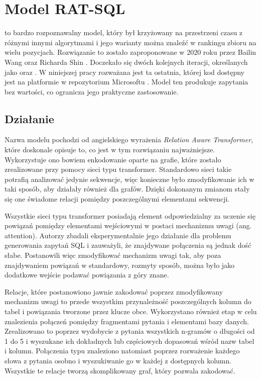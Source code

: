 \section{Model RAT-SQL}
 to bardzo rozpoznawalny model, który był krzyżowany na przestrzeni czasu z różnymi innymi algorytmami i jego warianty można znaleźć w rankingu zbioru  na wielu pozycjach. Rozwiązanie to zostało zaproponowane w 2020 roku przez Bailin Wang oraz Richarda Shin . Doczekało się dwóch kolejnych iteracji, określanych jako  oraz . W niniejszej pracy rozważana jest ta ostatnia, której kod dostępny jest na platformie  w repozytorium Microsoftu . Model ten produkuje zapytania bez wartości, co ogranicza jego praktyczne zastosowanie.

\subsection{Działanie}
Nazwa modelu  pochodzi od angielskiego wyrażenia \textit{Relation Aware Transformer}, które doskonale opisuje to, co jest w tym rozwiązaniu najważniejsze. Wykorzystuje ono bowiem enkodowanie oparte na grafie, które zostało zrealizowane przy pomocy sieci typu transformer. Standardowo sieci takie potrafią analizować jedynie sekwencje, więc konieczne było zmodyfikowanie ich w taki sposób, aby działały również dla grafów. Dzięki dokonanym zmianom stały się one świadome relacji pomiędzy poszczególnymi elementami sekwencji.

Wszystkie sieci typu transformer posiadają element odpowiedzialny za uczenie się powiązań pomiędzy elementami wejściowymi w postaci mechanizmu uwagi (ang. attention). Autorzy \mbox{} zbadali eksperymentalnie jego działanie dla problemu generowania zapytań SQL i zauważyli, że znajdywane połączenia są jednak dość słabe. Postanowili więc zmodyfikować mechanizm uwagi tak, aby poza znajdywaniem powiązań w standardowy, rozmyty sposób, można było jako dodatkowe wejście podawać powiązania z góry znane. 

Relacje, które postanowiono jawnie zakodować poprzez zmodyfikowany mechanizm uwagi to przede wszystkim przynależność poszczególnych kolumn do tabel i powiązania tworzone przez klucze obce. Wykorzystano również etap  w celu znalezienia połączeń pomiędzy fragmentami pytania i elementami bazy danych. Zrealizowano to poprzez wydobycie z pytania wszystkich n-gramów o długości od 1 do 5 i wyszukane ich dokładnych lub częściowych dopasowań wśród nazw tabel i kolumn. Połączenia typu  znaleziono natomiast poprzez rozważenie każdego słowa z pytania osobno i wyszukiwanie go w każdej z dostępnych kolumn. Wszystkie te relacje tworzą skomplikowany graf, który  pozwala zakodować.

